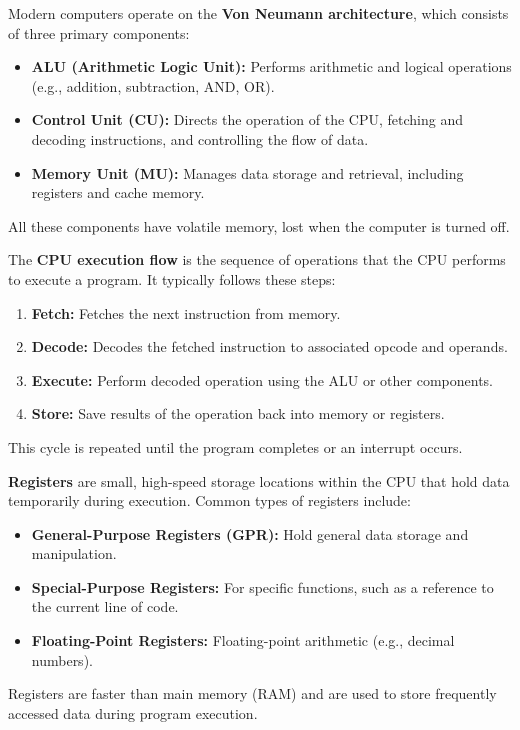 \newpage
\begin{Def}

    Modern computers operate on the \textbf{Von Neumann architecture}, which consists of three primary components:
    \begin{itemize}
        \item \textbf{ALU (Arithmetic Logic Unit):} Performs arithmetic and logical operations (e.g., addition, subtraction, AND, OR).
        \item \textbf{Control Unit (CU):} Directs the operation of the CPU, fetching and decoding instructions, and controlling the flow of data.
        \item \textbf{Memory Unit (MU):} Manages data storage and retrieval, including registers and cache memory.
    \end{itemize}
    \noindent
    All these components have volatile memory, lost when the computer is turned off.
\end{Def}

\begin{Def}
    
    \label{def:cpu_execution_flow}

    The \textbf{CPU execution flow} is the sequence of operations that the CPU performs to execute a program. 
    It typically follows these steps:
    \begin{enumerate}
        \item \textbf{Fetch:} Fetches the next instruction from memory.
        \item \textbf{Decode:} Decodes the fetched instruction to associated opcode and operands.
        \item \textbf{Execute:} Perform decoded operation using the ALU or other components.
        \item \textbf{Store:} Save results of the operation back into memory or registers.
    \end{enumerate}
    \noindent
    This cycle is repeated until the program completes or an interrupt occurs.
\end{Def}

\begin{Def}[Registers]

    \label{def:registers}

    \textbf{Registers} are small, high-speed storage locations within the CPU that hold data temporarily during execution. 
    Common types of registers include:
    \begin{itemize}
        \item \textbf{General-Purpose Registers (GPR):} Hold general data storage and manipulation.
        \item \textbf{Special-Purpose Registers:} For specific functions, such as a reference to the current line of code.
        \item \textbf{Floating-Point Registers:} Floating-point arithmetic (e.g., decimal numbers).
    \end{itemize}
    \noindent
    Registers are faster than main memory (RAM) and are used to store frequently accessed data during program execution.
\end{Def}

